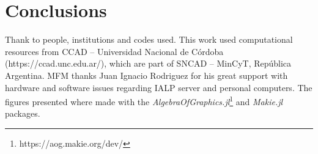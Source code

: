 \documentclass[twocolumn]{aa}
\begin{document}
\section{Conclusions}
\label{sec:conclusions}



\begin{acknowledgements}
    Thank to people, institutions and codes used.
    This work used computational resources from CCAD – Universidad Nacional de Córdoba (https://ccad.unc.edu.ar/), which are part of SNCAD – MinCyT, República Argentina.
    MFM thanks Juan Ignacio Rodriguez for his great support with hardware and
    software issues regarding IALP server and personal computers.
    The figures presented where made with the
    {\it AlgebraOfGraphics.jl}\footnote{https://aog.makie.org/dev/} and
    {\it Makie.jl}~\citep{DanischKrumbiegel2021}
    packages.
\end{acknowledgements}

%
%
%
\end{document}
